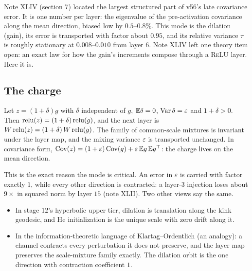 \label{sec:dilation}
Note XLIV (section 7) located the largest structured part of v56's late covariance error. It is one number per layer: the
eigenvalue of the pre-activation covariance along the mean direction, biased low by $0.5$--$0.8\%$. This mode is the dilation
(gain), its error is transported with factor about $0.95$, and its relative variance $\tau$ is roughly stationary at
$0.008$--$0.010$ from layer $6$. Note XLIV left one theory item open: an exact law for how the gain's increments compose through a
\textsc{ReLU} layer. Here it is.

\subsection{The charge}
\begin{proposition}\label{prop:charge}
Let $z=(1+\delta)g$ with $\delta$ independent of $g$, $\mathbb E\delta=0$, $\operatorname{Var}\delta=\varepsilon$ and $1+\delta>0$. Then
$\operatorname{relu}(z)=(1+\delta)\operatorname{relu}(g)$, and the next layer is $W\operatorname{relu}(z)=(1+\delta)\,W\operatorname{relu}(g)$. The family of common-scale mixtures is
invariant under the layer map, and the mixing variance $\varepsilon$ is transported unchanged. In covariance form,
$\operatorname{Cov}(z)=(1+\varepsilon)\operatorname{Cov}(g)+\varepsilon\,\mathbb E g\,\mathbb E g^\top$: the charge lives on the mean direction.
\end{proposition}
This is the exact reason the mode is critical. An error in $\varepsilon$ is carried with factor exactly $1$, while every other direction is
contracted: a layer-$3$ injection loses about $9\times$ in squared norm by layer $15$ (note XLII). Two other views say the same.
\begin{itemize}[leftmargin=*]
\item In stage 12's hyperbolic upper tier, dilation is translation along the kink geodesic, and He initialization is the unique
scale with zero drift along it.
\item In the information-theoretic language of Klartag--Ordentlich (an analogy): a channel contracts every perturbation it does not
preserve, and the layer map preserves the scale-mixture family exactly. The dilation orbit is the one direction with contraction
coefficient $1$.
\end{itemize}

